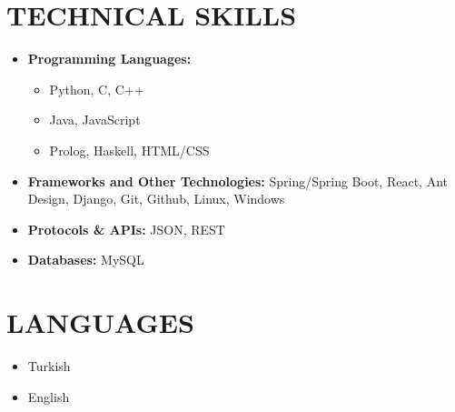 \begin{minipage}[t]{0.73\textwidth}
  \section{TECHNICAL SKILLS}
    \begin{multicols}{2}
      \begin{itemize}[leftmargin=0.25in, itemsep=1pt]
        \item \textbf{Programming Languages:} 
          \begin{itemize}[label={-}, leftmargin=0.2in]
            \item Python, C, C++
            \item Java, JavaScript
            \item Prolog, Haskell, HTML/CSS
          \end{itemize}
        \vspace{\fill}

        \item \textbf{Frameworks and Other Technologies:} 
          Spring/Spring Boot, React, Ant Design, Django, Git, Github, Linux, Windows
        
        \item \textbf{Protocols \& APIs:} 
          JSON, REST

        \item \textbf{Databases:} 
          MySQL
      \end{itemize}
    \end{multicols}
\end{minipage}
\hspace{\fill}
\begin{minipage}[t]{0.22\textwidth}
  \section{LANGUAGES}
    \begin{itemize}[leftmargin=0.25in, itemsep=1pt]
      \item Turkish
      \item English
    \end{itemize}
\end{minipage}
